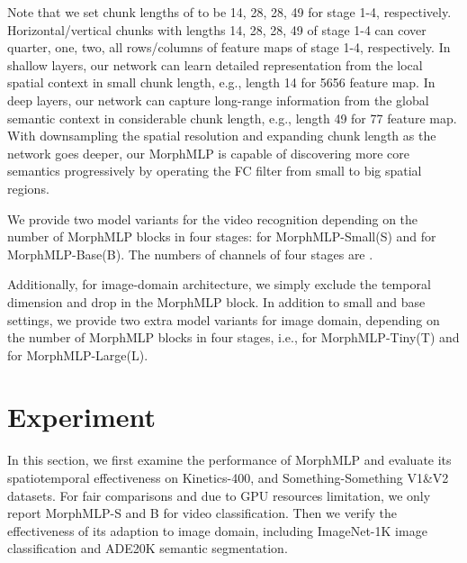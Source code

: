 \documentclass[runningheads]{llncs}
\begin{document}
Note that we set chunk lengths of  to be 14, 28, 28, 49 for stage 1-4, respectively. Horizontal/vertical chunks  with lengths 14, 28, 28, 49 of stage 1-4 can cover quarter, one, two, all rows/columns of feature maps of stage 1-4, respectively. In shallow layers,  our network can learn detailed representation from the local spatial context in small chunk length, e.g., length 14 for 5656
feature map. In deep layers, our network can capture long-range information from the global semantic context in considerable chunk length, e.g., length 49 for  77 feature map. With downsampling the spatial resolution and expanding chunk length as the network goes deeper, our MorphMLP is capable of discovering more core semantics progressively by operating the FC filter from small to big spatial regions.














We provide two model variants for the video recognition depending on the number of MorphMLP blocks in four stages:  for MorphMLP-Small(S) and    for MorphMLP-Base(B).
The numbers of channels of four stages are  .

 Additionally,
for image-domain architecture,  we simply exclude the temporal dimension and drop  in the MorphMLP block. 
In addition to small and base settings, 
we provide two extra model variants for image domain,
depending on the number of MorphMLP blocks in four stages,
i.e.,
 for MorphMLP-Tiny(T) 
and  
  for MorphMLP-Large(L).








 
\section{Experiment}
In this section, we first examine the performance of MorphMLP  and evaluate its spatiotemporal effectiveness on Kinetics-400\cite{k400}, and Something-Something V1\&V2 \cite{sth} datasets. For fair comparisons and due to GPU resources limitation, we only report MorphMLP-S and B for video classification.
Then we verify the effectiveness of its adaption to image domain, including ImageNet-1K \cite{imagenet} image classification and ADE20K\cite{ade20k} semantic segmentation.
\end{document}
